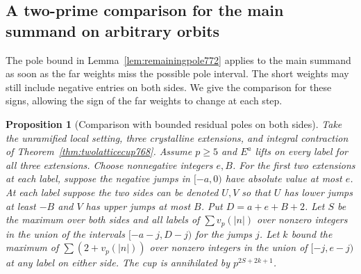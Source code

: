 \documentclass[a4paper,11pt]{article}
\newtheorem{proposition}{Proposition}[section]
\theoremstyle{definition}
\theoremstyle{remark}
\numberwithin{equation}{section}
\begin{document}
\clearpage

\subsection{A two-prime comparison for the main summand on arbitrary orbits}
\label{sec:interior795}
The pole bound in Lemma~\ref{lem:remainingpole772} applies to
the main summand as soon as the far weights miss the possible
pole interval. The short weights may still include negative
entries on both sides. We give the comparison for these signs,
allowing the sign of the far weights to change at each step.

\begin{proposition}[Comparison with bounded residual poles on both sides]
\leavevmode\label{prop:residualpoles795}
Take the unramified local setting, three crystalline extensions,
and integral contraction of Theorem~\ref{thm:twolatticecup768}.
Assume \(p\ge5\) and \(E^a\) lifts on every label for all three
extensions. Choose nonnegative integers \(e,B\). For the first
two extensions at each label, suppose the negative jumps in
\([-a,0)\) have absolute value at most \(e\). At each label
suppose the two sides can be denoted \(U,V\) so that \(U\)
has lower jumps at least \(-B\) and \(V\) has upper jumps at
most \(B\). Put \(D=a+e+B+2\). Let \(S\) be the maximum over
both sides and all labels of
\(\sum v_p(|n|)\) over nonzero integers in the union of the
intervals \([-a-j,D-j)\) for the jumps \(j\). Let \(k\) bound
the maximum of \(\sum (2+v_p(|n|))\) over nonzero integers in
the union of \([-j,e-j)\) at any label on either side.
The cup is annihilated by \(p^{2S+2k+1}\).
\end{proposition}
\end{document}
